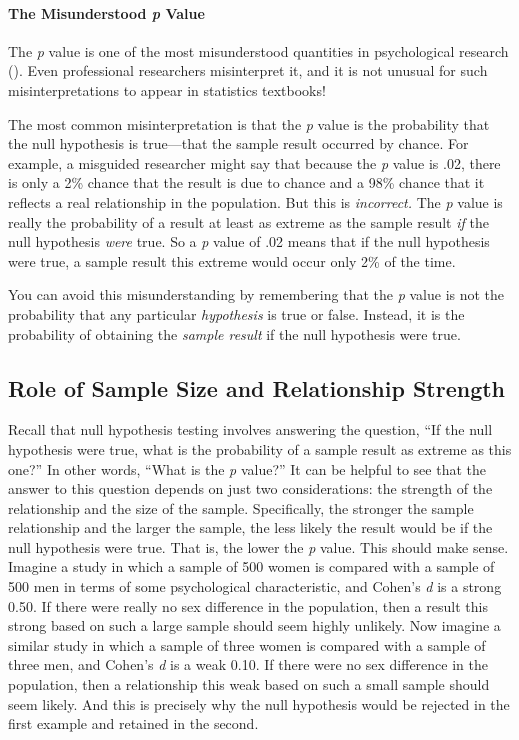 \documentclass[
]{krantz}
\begin{document}
\paragraph*{\texorpdfstring{The Misunderstood \emph{p} Value}{The Misunderstood p Value}}\label{the-misunderstood-p-value}

The \emph{p} value is one of the most misunderstood quantities in psychological research (). Even professional researchers misinterpret it, and it is not unusual for such misinterpretations to appear in statistics textbooks!

The most common misinterpretation is that the \emph{p} value is the probability that the null hypothesis is true---that the sample result occurred by chance. For example, a misguided researcher might say that because the \emph{p} value is .02, there is only a 2\% chance that the result is due to chance and a 98\% chance that it reflects a real relationship in the population. But this is \emph{incorrect.} The \emph{p} value is really the probability of a result at least as extreme as the sample result \emph{if} the null hypothesis \emph{were} true. So a \emph{p} value of .02 means that if the null hypothesis were true, a sample result this extreme would occur only 2\% of the time.

You can avoid this misunderstanding by remembering that the \emph{p} value is not the probability that any particular \emph{hypothesis} is true or false. Instead, it is the probability of obtaining the \emph{sample result} if the null hypothesis were true.

\subsection*{Role of Sample Size and Relationship Strength}\label{role-of-sample-size-and-relationship-strength}


Recall that null hypothesis testing involves answering the question, ``If the null hypothesis were true, what is the probability of a sample result as extreme as this one?'' In other words, ``What is the \emph{p} value?'' It can be helpful to see that the answer to this question depends on just two considerations: the strength of the relationship and the size of the sample. Specifically, the stronger the sample relationship and the larger the sample, the less likely the result would be if the null hypothesis were true. That is, the lower the \emph{p} value. This should make sense. Imagine a study in which a sample of 500 women is compared with a sample of 500 men in terms of some psychological characteristic, and Cohen's \emph{d} is a strong 0.50. If there were really no sex difference in the population, then a result this strong based on such a large sample should seem highly unlikely. Now imagine a similar study in which a sample of three women is compared with a sample of three men, and Cohen's \emph{d} is a weak 0.10. If there were no sex difference in the population, then a relationship this weak based on such a small sample should seem likely. And this is precisely why the null hypothesis would be rejected in the first example and retained in the second.
\end{document}
